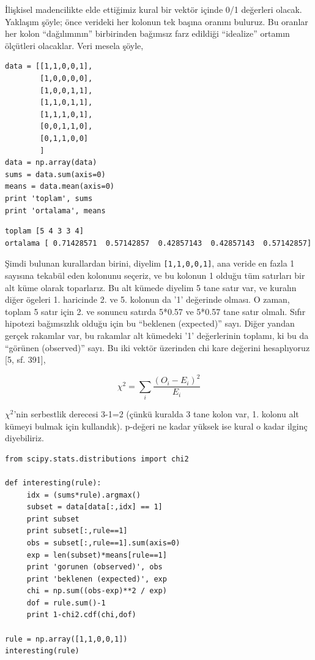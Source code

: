 \documentclass[12pt,fleqn]{article}\usepackage{../../common}
\begin{document}
İlişkisel madencilikte elde ettiğimiz kural bir vektör içinde 0/1 değerleri
olacak. Yaklaşım şöyle; önce verideki her kolonun tek başına oranını
buluruz. Bu oranlar her kolon ``dağılımının'' birbirinden bağımsız farz
edildiği ``idealize'' ortamın ölçütleri olacaklar. Veri mesela şöyle,

\begin{verbatim}
data = [[1,1,0,0,1],
        [1,0,0,0,0],
        [1,0,0,1,1],
        [1,1,0,1,1],
        [1,1,1,0,1],
        [0,0,1,1,0],
        [0,1,1,0,0]
        ]
data = np.array(data)
sums = data.sum(axis=0)
means = data.mean(axis=0)
print 'toplam', sums
print 'ortalama', means
\end{verbatim}

\begin{verbatim}
toplam [5 4 3 3 4]
ortalama [ 0.71428571  0.57142857  0.42857143  0.42857143  0.57142857]
\end{verbatim}

Şimdi bulunan kurallardan birini, diyelim \verb![1,1,0,0,1]!, ana veride en
fazla 1 sayısına tekabül eden kolonunu seçeriz, ve bu kolonun 1 olduğu tüm
satırları bir alt küme olarak toparlarız. Bu alt kümede diyelim 5 tane
satır var, ve kuralın diğer ögeleri 1. haricinde 2. ve 5.  kolonun da '1'
değerinde olması. O zaman, toplam 5 satır için 2. ve sonuncu satırda 5*0.57
ve 5*0.57 tane satır olmalı. Sıfır hipotezi bağımsızlık olduğu için bu
``beklenen (expected)'' sayı. Diğer yandan gerçek rakamlar var, bu rakamlar
alt kümedeki '1' değerlerinin toplamı, ki bu da ``görünen (observed)''
sayı. Bu iki vektör üzerinden chi kare değerini hesaplıyoruz [5, sf. 391],

$$ \chi^2 = \sum_i \frac{(O_i-E_i)^2}{E_i} $$

$\chi^2$'nin serbestlik derecesi 3-1=2 (çünkü kuralda 3 tane kolon var,
1. kolonu alt kümeyi bulmak için kullandık). p-değeri ne kadar yüksek ise
kural o kadar ilginç diyebiliriz.

\begin{verbatim}
from scipy.stats.distributions import chi2

def interesting(rule): 
     idx = (sums*rule).argmax()
     subset = data[data[:,idx] == 1]
     print subset
     print subset[:,rule==1]
     obs = subset[:,rule==1].sum(axis=0)
     exp = len(subset)*means[rule==1]
     print 'gorunen (observed)', obs
     print 'beklenen (expected)', exp
     chi = np.sum((obs-exp)**2 / exp)
     dof = rule.sum()-1
     print 1-chi2.cdf(chi,dof)

rule = np.array([1,1,0,0,1])
interesting(rule)
\end{verbatim}
\end{document}
